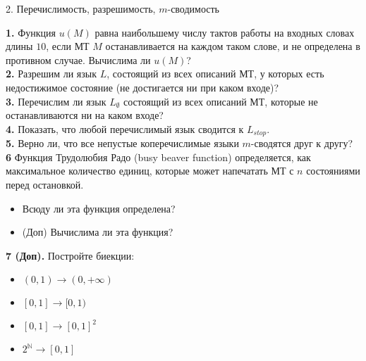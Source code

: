 \documentclass[11pt,a5paper,fleqn]{article}
\begin{document}
\begin{center}
{ \Large 2. Перечислимость, разрешимость, $m$-сводимость}

\end{center}
{\bf 1.} Функция $u(M)$ равна наибольшему числу тактов работы на входных словах длины $10$, если МТ $M$ останавливается на каждом таком слове, и не определена в противном случае. Вычислима ли $u(M)$?\\
\smallskip
{\bf 2.}  Разрешим ли язык $L$, состоящий из всех описаний МТ, у которых есть недостижимое состояние (не достигается ни при каком входе)?\\
\smallskip
{\bf 3.}  Перечислим ли язык $L_\emptyset$ состоящий из всех описаний МТ, которые не останавливаются ни на каком входе? \\
\smallskip
{\bf 4.}  Показать, что любой перечислимый язык сводится к $L_{stop}$.\\
\smallskip
{\bf 5.}  Верно ли, что все непустые коперечислимые языки $m$-сводятся друг к другу?\\
\smallskip
{\bf 6}  Функция Трудолюбия Радо (busy beaver function) определяется, как максимальное количество единиц, которые может напечатать МТ с $n$ состояниями перед остановкой. 
\begin{itemize}
\item Всюду ли эта функция определена?
\item (Доп) Вычислима ли эта функция?
\end{itemize}
\smallskip
{\bf 7 (Доп).}  Постройте биекции: 
\begin{itemize}
\item $(0, 1) \rightarrow (0, +\infty)$
\item $[0, 1] \rightarrow [0, 1)$
\item $[0, 1] \rightarrow [0, 1]^2$
\item $2^\mathbb{N} \rightarrow [0, 1]$
\end{itemize}
\end{document}
